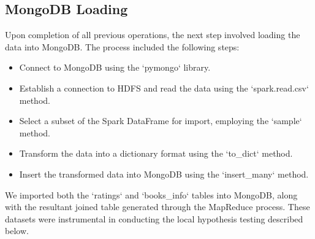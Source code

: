 \subsection*{MongoDB Loading}
Upon completion of all previous operations, the next step involved loading the data into MongoDB. The process included the following steps:

\begin{itemize}[leftmargin=*, noitemsep]
    \item Connect to MongoDB using the `pymongo` library.
    \item Establish a connection to HDFS and read the data using the `spark.read.csv` method.
    \item Select a subset of the Spark DataFrame for import, employing the `sample` method.
    \item Transform the data into a dictionary format using the `to\_dict` method.
    \item Insert the transformed data into MongoDB using the `insert\_many` method.
\end{itemize}

\noindent
We imported both the `ratings` and `books\_info` tables into MongoDB, along with the resultant joined table generated through 
the MapReduce process. These datasets were instrumental in conducting the local hypothesis testing described below.
